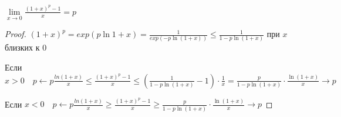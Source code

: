 \begin{theorem-non}
    $\lim\limits_{x \rightarrow 0}{\frac{(1+x)^p - 1}{x}} = p$
    \begin{proof}
        $(1+x)^p = exp(p \ln{1 + x}) = \frac{1}{exp(-p \ln{(1+x)})} \leqslant \frac{1}{1 - p \ln{(1+x)}}$ при $x$ близких к 0

        Если $x > 0 \quad p \longleftarrow p\frac{ln(1+x)}{x} \leqslant \frac{(1+x)^p - 1}{x} \leqslant \left(\frac{1}{1 - p\ln{(1+x)}} - 1\right)\cdot \frac{1}{x} =
        \frac{p}{1 - p\ln{(1+x)}} \cdot \frac{\ln{(1+x)}}{x} \longrightarrow p$ 

        Если $x < 0 \quad p \longleftarrow p\frac{ln(1+x)}{x} \geqslant \frac{(1+x)^p - 1}{x} \geqslant
        \frac{p}{1 - p\ln{(1+x)}} \cdot \frac{\ln{(1+x)}}{x} \longrightarrow p$ 
    \end{proof}
\end{theorem-non}